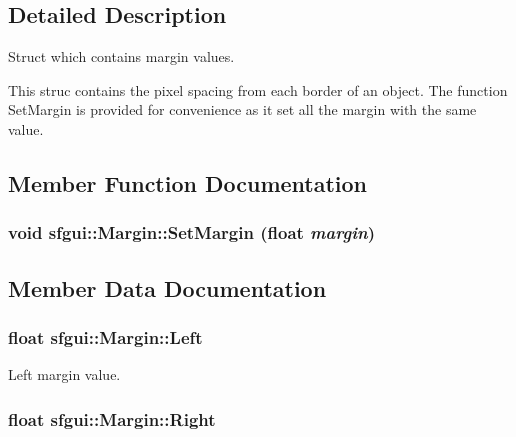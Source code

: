 \subsection{Detailed Description}
Struct which contains margin values. 

This struc contains the pixel spacing from each border of an object. The function SetMargin is provided for convenience as it set all the margin with the same value. 

\subsection{Member Function Documentation}
\hypertarget{structsfgui_1_1Margin_6a505d8275fe7965b863d437dd54b195}{
\subsubsection[SetMargin]{\setlength{\rightskip}{0pt plus 5cm}void sfgui::Margin::SetMargin (float {\em margin})}}
\label{structsfgui_1_1Margin_6a505d8275fe7965b863d437dd54b195}




\subsection{Member Data Documentation}
\hypertarget{structsfgui_1_1Margin_fb75f9e4550f4eb5d26c6af936f7e098}{
\subsubsection[Left]{\setlength{\rightskip}{0pt plus 5cm}float {\bf sfgui::Margin::Left}}}
\label{structsfgui_1_1Margin_fb75f9e4550f4eb5d26c6af936f7e098}


Left margin value. 

\hypertarget{structsfgui_1_1Margin_fef8bae507f9cc00a42f442256062b66}{
\subsubsection[Right]{\setlength{\rightskip}{0pt plus 5cm}float {\bf sfgui::Margin::Right}}}
\label{structsfgui_1_1Margin_fef8bae507f9cc00a42f442256062b66}


